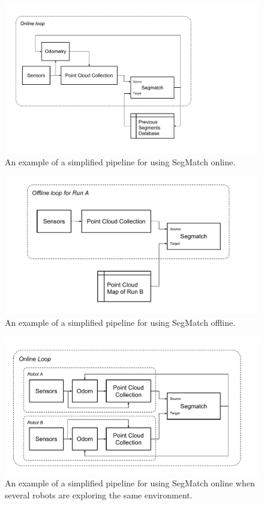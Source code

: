 \begin{figure}
  \centering
  \includegraphics[width=5.2in]{images/Online_Pipeline.pdf}
  \caption{An example of a simplified pipeline for using SegMatch online.}
  \label{fig:online_pipeline}
\end{figure}

\begin{figure}
  \centering
  \includegraphics[width=5.2in]{images/Offline_Pipeline.pdf}
  \caption{An example of a simplified pipeline for using SegMatch offline.}
  \label{fig:offline_pipeline}
\end{figure}

\begin{figure}
  \centering
  \includegraphics[width=5.2in]{images/Multi-robot_Pipeline.pdf}
  \caption{An example of a simplified pipeline for using SegMatch online when several robots are exploring the same environment.}
  \label{fig:multirobot_pipeline}
\end{figure}


